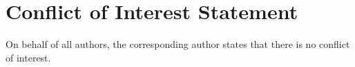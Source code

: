 \documentclass[smallextended]{svjour3}       %
\begin{document}






\section*{Conflict of Interest Statement}
On behalf of all authors, the corresponding author states that there is no conflict of interest.


\end{document}
